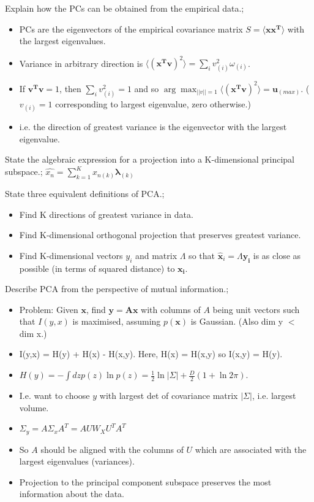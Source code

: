 \documentclass{article}
\begin{document}
Explain how the PCs can be obtained from the empirical data.; \begin{itemize}
	\item PCs are the eigenvectors of the empirical covariance matrix $S=\langle\mathbf{xx^T}\rangle$ with the largest eigenvalues.
	\item Variance in arbitrary direction is $\langle (\mathbf{x^Tv})^2\rangle =\sum_i v_{(i)}^2\omega_{(i)}$.
	\item If $\mathbf{v^Tv}=1$, then $\sum_i v_{(i)}^2=1$ and so $\arg\max_{||v||=1} \langle (\mathbf{x^Tv})^2\rangle = \mathbf{u}_{(max)}$. ($v_{(i)}=1$ corresponding to largest eigenvalue, zero otherwise.)
	\item i.e. the direction of greatest variance is the eigenvector with the largest eigenvalue.
\end{itemize}

State the algebraic expression for a projection into a K-dimensional principal subspace.; $\hat{x_n} = \sum_{k=1}^K x_{n(k)}\mathbf{\lambda}_{(k)}$

State three equivalent definitions of PCA.; \begin{itemize}
	\item Find K directions of greatest variance in data.
	\item Find K-dimensional orthogonal projection that preserves greatest variance.
	\item Find K-dimensional vectors $y_i$ and matrix $\Lambda$ so that $\hat{\mathbf{x}}_i = \Lambda\mathbf{y_i}$ is as close as possible (in terms of squared distance) to $\mathbf{x_i}$.
\end{itemize}

Describe PCA from the perspective of mutual information.; \begin{itemize}
	\item Problem: Given $\mathbf{x}$, find $\mathbf{y = Ax}$ with columns of $A$ being unit vectors such that $I(y,x)$ is maximised, assuming $p(\mathbf{x})$ is Gaussian. (Also dim y $<$ dim x.)
	\item I(y,x) = H(y) + H(x) - H(x,y). Here, H(x) = H(x,y) so I(x,y) = H(y).
	\item $H(y)=-\int dz p(z) \ln p(z) = \frac{1}{2}\ln|\Sigma|+\frac{D}{2}(1+\ln 2\pi )$.
	\item I.e. want to choose $y$ with largest det of covariance matrix $|\Sigma|$, i.e. largest volume.
	\item $\Sigma_y = A\Sigma_x A^T = AUW_XU^TA^T$
	\item So $A$ should be aligned with the columns of $U$ which are associated with the largest eigenvalues (variances).
	\item Projection to the principal component subspace preserves the most information about the data.
\end{itemize}
\end{document}
